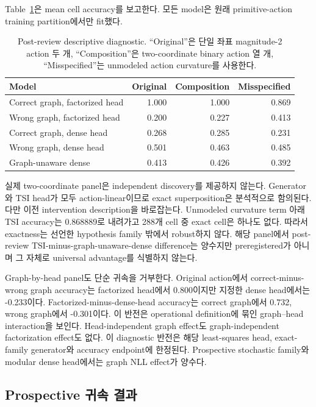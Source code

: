 Table~\ref{tab:postreview}은 mean cell accuracy를 보고한다. 모든 model은 원래
primitive-action training partition에서만 fit했다.

\begin{table}[ht]
\centering
\small
\caption{Post-review descriptive diagnostic. ``Original''은 단일 좌표
magnitude-2 action 두 개, ``Composition''은 two-coordinate binary action 열 개,
``Misspecified''는 unmodeled action curvature를 사용한다.}
\label{tab:postreview}
\begin{tabular}{lrrr}
\toprule
Model & Original & Composition & Misspecified\\
\midrule
Correct graph, factorized head & 1.000 & 1.000 & 0.869\\
Wrong graph, factorized head & 0.200 & 0.227 & 0.413\\
Correct graph, dense head & 0.268 & 0.285 & 0.231\\
Wrong graph, dense head & 0.501 & 0.463 & 0.485\\
Graph-unaware dense & 0.413 & 0.426 & 0.392\\
\bottomrule
\end{tabular}
\end{table}

실제 two-coordinate panel은 independent discovery를 제공하지 않는다. Generator와
TSI head가 모두 action-linear이므로 exact superposition은 분석적으로 함의된다.
다만 이전 intervention description을 바로잡는다. Unmodeled curvature term 아래
TSI accuracy는 0.868889로 내려가고 288개 cell 중 exact cell은 하나도 없다. 따라서
exactness는 선언한 hypothesis family 밖에서 robust하지 않다. 해당 panel에서
post-review TSI-minus-graph-unaware-dense difference는 양수지만 preregistered가
아니며 그 자체로 universal advantage를 식별하지 않는다.

Graph-by-head panel도 단순 귀속을 거부한다. Original action에서 correct-minus-wrong
graph accuracy는 factorized head에서 0.800이지만 지정한 dense head에서는
-0.233이다. Factorized-minus-dense-head accuracy는 correct graph에서 0.732,
wrong graph에서 -0.301이다. 이 반전은 operational definition에 묶인 graph--head
interaction을 보인다. Head-independent graph effect도 graph-independent
factorization effect도 없다.
이 diagnostic 반전은 해당 least-squares head, exact-family generator와 accuracy
endpoint에 한정된다. Prospective stochastic family와 modular dense head에서는 graph
NLL effect가 양수다.

\subsection{Prospective 귀속 결과}

